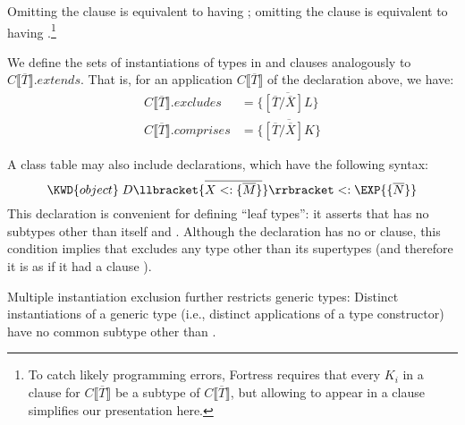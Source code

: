 \documentclass[10pt]{sigplanconf}
\renewcommand{\bar}{\overline}
\newcommand{\myexcludes}[1]{{#1}.\textit{excludes}}
\newcommand{\mycomprises}[1]{{#1}.\textit{comprises}}
\newcommand{\myextends}[1]{{#1}.\textit{extends}}
\newcommand{\extends}{\ensuremath{<:}}
\newcommand{\ob}[1]{\ensuremath{\llbracket {#1} \rrbracket}}
\newcommand{\obb}[1]{\ensuremath{\llbracket \bar{#1} \rrbracket}}
\newcommand{\bd}[1]{\ensuremath{\{\bar{#1}\}}}
\newcommand{\substb}[2]{\ensuremath{[\bar{#1}/\bar{#2}]}}
\newcommand{\bds}[2]{\ensuremath{\bar{{#1} \extends \bd{#2}}}}
\newcommand{\tplist}[2]{\ensuremath{\ob{\bds{#1}{#2}}}}
\newcommand{\Bottom}{\TYP{Bottom}}
\begin{document}

Omitting the  clause is equivalent to having ;
omitting the  clause is equivalent to having .\!\footnote{%
To catch likely programming errors, 
Fortress requires that 
every $K_i$ in a  clause for $C\obb{T}$ be a subtype of $C\obb{T}$, 
but allowing  to appear in a  clause simplifies our presentation here.}

We define the sets of instantiations of types 
in  and  clauses analogously to $\myextends{C\obb{T}}$.
That is, 
for an application $C\obb{T}$ 
of the declaration above, we have:\\[-.5em]
\begin{align*}
\myexcludes{C\obb{T}}  &= \{ \bar{\substb{T}{X}L} \} \\
\mycomprises{C\obb{T}} &= \{ \bar{\substb{T}{X}K} \}
\end{align*}

A class table may also include  declarations, 
which have the following syntax:
\[
\KWD{object} \; D\tplist{X}{M} \extends \EXP{\lbrace\bar{N}\rbrace}
\]
This declaration is convenient for defining ``leaf types'': 
it asserts that \EXP{D\llbracket\bar{T}\rrbracket} has no subtypes 
other than itself and \Bottom.
Although the declaration has no  or  clause, 
this condition implies that \EXP{D\llbracket\bar{T}\rrbracket} 
excludes any type other than its supertypes
(and therefore it is as if it had a clause ).

Multiple instantiation exclusion 
further restricts generic types: 
Distinct instantiations of a generic type 
(i.e., distinct applications of a type constructor) 
have no common subtype other than \Bottom.
\end{document}
